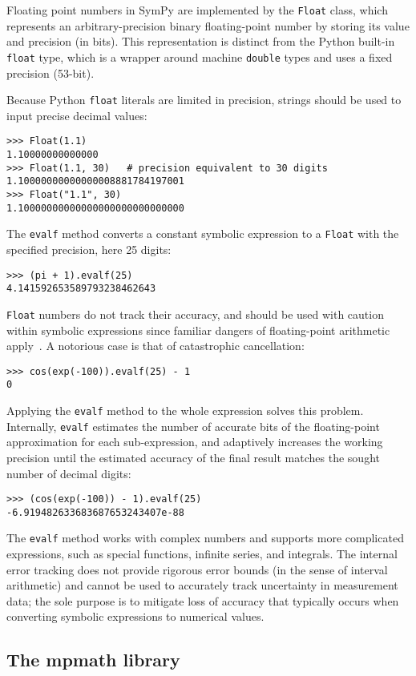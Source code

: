 Floating point numbers in SymPy are implemented by the \texttt{Float} class,
which represents an arbitrary-precision binary floating-point number by
storing its value and precision (in bits). This representation is distinct
from the Python built-in \texttt{float} type, which is a wrapper around
machine \texttt{double} types and uses a fixed precision (53-bit).

Because Python \texttt{float} literals are limited in precision, strings
should be used to input precise decimal values:
\begin{verbatim}
>>> Float(1.1)
1.10000000000000
>>> Float(1.1, 30)   # precision equivalent to 30 digits
1.10000000000000008881784197001
>>> Float("1.1", 30)
1.10000000000000000000000000000
\end{verbatim}
The \texttt{evalf} method converts a constant symbolic expression to a
\texttt{Float} with the specified precision, here 25 digits:
\begin{verbatim}
>>> (pi + 1).evalf(25)
4.141592653589793238462643
\end{verbatim}
\texttt{Float} numbers do not track their accuracy,
and should be used with caution within symbolic expressions
since familiar dangers of floating-point arithmetic apply~\cite{goldberg1991every}.
A notorious case is that of catastrophic cancellation:
\begin{verbatim}
>>> cos(exp(-100)).evalf(25) - 1
0
\end{verbatim}
Applying the \texttt{evalf} method to the whole expression solves
this problem. Internally, \texttt{evalf} estimates the number of accurate
bits of the floating-point
approximation for each sub-expression, and adaptively increases the
working precision until the estimated accuracy of the
final result matches the sought number of decimal digits:
\begin{verbatim}
>>> (cos(exp(-100)) - 1).evalf(25)
-6.919482633683687653243407e-88
\end{verbatim}
The \texttt{evalf} method works with complex numbers and supports
more complicated expressions, such as
special functions, infinite series, and integrals.
The internal error tracking does not provide rigorous error bounds
(in the sense of interval arithmetic) and cannot be used to accurately track
uncertainty in measurement data;
the sole purpose is to mitigate loss of accuracy that typically occurs
when converting symbolic expressions to numerical values.

\subsection{The mpmath library}

